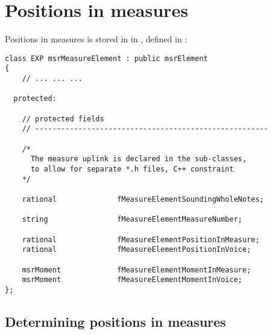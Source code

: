 

\chapter{Positions in measures}

Positions in measures is stored in  in , defined in :
\begin{lstlisting}[language=CPlusPlus]
class EXP msrMeasureElement : public msrElement
{
	// ... ... ...
	
  protected:

    // protected fields
    // ------------------------------------------------------

    /*
      The measure uplink is declared in the sub-classes,
      to allow for separate *.h files, C++ constraint
    */

    rational              fMeasureElementSoundingWholeNotes;

    string                fMeasureElementMeasureNumber;

    rational              fMeasureElementPositionInMeasure;
    rational              fMeasureElementPositionInVoice;

    msrMoment             fMeasureElementMomentInMeasure;
    msrMoment             fMeasureElementMomentInVoice;
};
\end{lstlisting}

\section{Determining positions in measures}

